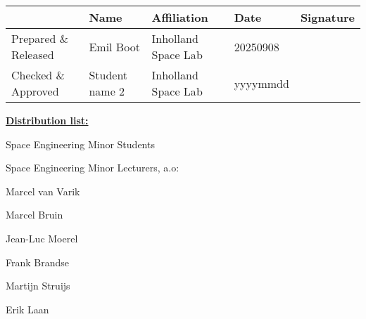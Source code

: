 
\maketitle\thispagestyle{fancy}


\begin{table}[htp]
\centering
\renewcommand{\arraystretch}{1.2} %
\begin{tabularx}{\textwidth}{p{2cm} X X X X }
 & Name & Affiliation & Date &  Signature\\
\hline
\raggedright{Prepared \& Released} & Emil Boot & Inholland Space Lab & 20250908\\
\hline
\raggedright{Checked \& Approved} & Student name 2 & Inholland Space Lab & yyyymmdd\\
\hline
\end{tabularx}
\end{table}



\textbf{\uline{Distribution list:}}

Space Engineering Minor Students

Space Engineering Minor Lecturers, a.o:

Marcel van Varik

Marcel Bruin

Jean-Luc Moerel

Frank Brandse

Martijn Struijs

Erik Laan
